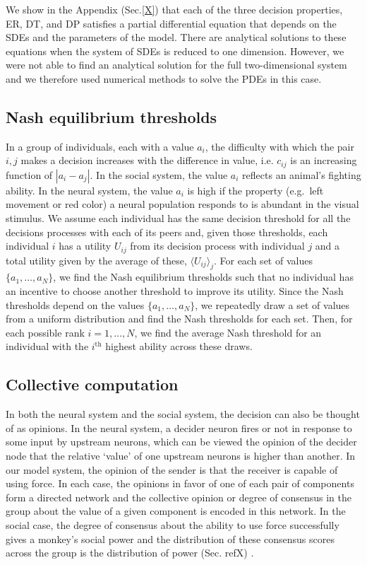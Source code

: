 \documentclass{pnastwo}
\begin{document}
\begin{article}
We show in the Appendix (Sec.\ref{X}) that each of the three decision properties, ER, DT, and DP satisfies a partial differential equation that depends on the SDEs and the parameters of the model. There are analytical solutions to these equations when the system of SDEs is reduced to one dimension. However, we were not able to find an analytical solution for the full two-dimensional system and we therefore used numerical methods to solve the PDEs in this case.

\subsection{Nash equilibrium thresholds}
In a group of individuals, each with a value $a_i$, the difficulty with which the pair $i,j$ makes a decision increases with the difference in value, i.e. $c_{ij}$ is an increasing function of $|a_i-a_j|$. In the social system, the value $a_i$ reflects an animal's fighting ability. In the neural system, the value $a_i$ is high if the property (e.g.\ left movement or red color) a neural population responds to is abundant in the visual stimulus. We assume each individual has the same decision threshold for all the decisions processes with each of its peers and, given those thresholds, each individual $i$ has a utility $U_{ij}$ from its decision process with individual $j$ and a total utility given by the average of these, $\langle U_{ij}\rangle _j$. For each set of values $\{a_1,\dots,a_N\}$, we find the Nash equilibrium thresholds such that no individual has an incentive to choose another threshold to improve its utility.  Since the Nash thresholds depend on the values $\{a_1,\dots,a_N\}$,  we repeatedly draw a set of values from a uniform distribution and find the Nash thresholds for each set. Then, for each possible rank $i=1,\dots,N$, we find the average Nash threshold for an individual with the $i^{\text{th}}$ highest ability across these draws.   

\subsection{Collective computation}
\label{computation}
In both the neural system and the social system, the decision can also be thought of as opinions. In the neural system, a decider neuron fires or not in response to some input by upstream neurons, which can be viewed the opinion of the decider node that the relative `value' of one upstream neurons is higher than another. In our model system, the opinion of the sender is that the receiver is capable of using force. In each case, the opinions  in favor of one of each pair of components form a directed network and the collective opinion or degree of consensus in the group about the value of a given component is encoded in this network. In the social case, the degree of consensus about the ability to use force successfully gives a monkey's social power and the distribution of these consensus scores across the group is the distribution of power (Sec. refX) \cite{Brush:2013fk, Flack:2006uq}.


\end{article}
\end{document}
